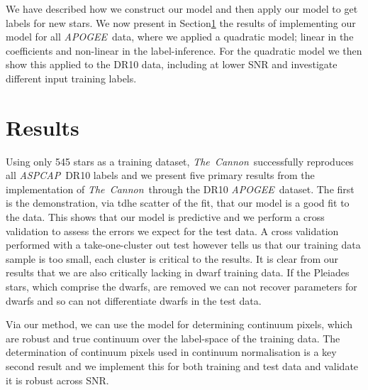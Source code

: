\documentclass[12pt, preprint]{aastex}
\newcommand{\tc}{\textsl{The~Cannon}}
\newcommand{\apogee}{\textsl{APOGEE}}
\newcommand{\aspcap}{\textsl{ASPCAP}}
\begin{document}
We have described how we construct our model and then apply our model to get labels for new stars. 
We now present in Section\ref{sec:results} the results of implementing our model for all \apogee\ data, where we applied a quadratic model; linear in the coefficients and non-linear in the label-inference.  
For the quadratic model we then show this applied to the DR10 data, including at lower SNR and investigate different input training labels. 



\section{Results}
\label{sec:results}


Using only 545 stars as a training dataset, \tc\ successfully reproduces all \aspcap\ DR10 labels and we present five primary results from the implementation of \tc\ through the DR10 \apogee\ dataset. 
The first is the demonstration, via tdhe scatter of the fit, that our model is a good fit to the data. 
This shows that our model is predictive and we perform a cross validation to assess the errors we expect for the test data. 
A cross validation performed with a take-one-cluster out test however tells us that our training data sample is too small, each cluster is critical to the results. 
It is clear from our results that we are also critically lacking in dwarf training data. If the Pleiades stars, which comprise the dwarfs, are removed we can not recover parameters for dwarfs and so can not differentiate dwarfs in the test data.

Via our method, we can use the model for determining continuum pixels, which are robust and true continuum over the label-space of the training data. 
The determination of continuum pixels used in continuum normalisation is a key second result and we implement this for both training and test data and validate it is robust across SNR. 
\end{document}
